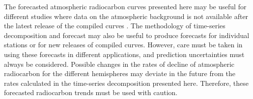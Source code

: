 The forecasted atmospheric radiocarbon curves presented here may be useful for different studies where data on the atmospheric background is not available after the latest release of the compiled curves \citep{Hua2013Radiocarbon}. The methodology of time-series decomposition and forecast may also be useful to produce forecasts for individual stations or for new releases of compiled curves. However, care must be taken in using these forecasts in different applications, and prediction uncertainties must always be considered.
Possible changes in the rates of decline of atmospheric radiocarbon for the different hemispheres may deviate in the future from the rates calculated in the time-series decomposition presented here. Therefore, these forecasted radiocarbon trends must be used with caution.

